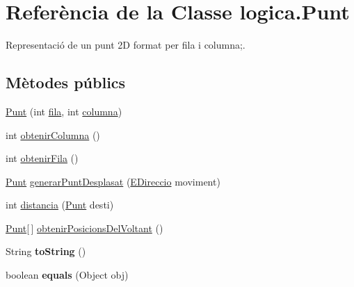\hypertarget{classlogica_1_1_punt}{\section{Referència de la Classe logica.\+Punt}
\label{classlogica_1_1_punt}
}


Representació de un punt 2\+D format per fila i columna;.  


\subsection*{Mètodes públics}
\begin{DoxyCompactItemize}
\item 
\hyperlink{classlogica_1_1_punt_ab09e076ff785e505903c303a6b390844}{Punt} (int \hyperlink{classlogica_1_1_punt_a34834a8a3fba60abcf1f24875adada16}{fila}, int \hyperlink{classlogica_1_1_punt_a3ad06f8482defd7f0306107e747f714e}{columna})
\item 
int \hyperlink{classlogica_1_1_punt_a111fa13504fb44338c3ebae2e4eb104b}{obtenir\+Columna} ()
\item 
int \hyperlink{classlogica_1_1_punt_ac12261ec7534827c8cb7b4cba5bdd5db}{obtenir\+Fila} ()
\item 
\hyperlink{classlogica_1_1_punt}{Punt} \hyperlink{classlogica_1_1_punt_a8198234b3d10d9f83e634b0390c84dcb}{generar\+Punt\+Desplasat} (\hyperlink{enumlogica_1_1enumeracions_1_1_e_direccio}{E\+Direccio} moviment)
\item 
int \hyperlink{classlogica_1_1_punt_a20bb4168bbedb81b73947bfeaf31512a}{distancia} (\hyperlink{classlogica_1_1_punt}{Punt} desti)
\item 
\hyperlink{classlogica_1_1_punt}{Punt}\mbox{[}$\,$\mbox{]} \hyperlink{classlogica_1_1_punt_aae8b444d685a4fab660a51838fc42406}{obtenir\+Posicions\+Del\+Voltant} ()
\item 
\hypertarget{classlogica_1_1_punt_a7ecb9a24b9520b5036471fae8ef3aad5}{String {\bfseries to\+String} ()}\label{classlogica_1_1_punt_a7ecb9a24b9520b5036471fae8ef3aad5}

\item 
\hypertarget{classlogica_1_1_punt_a2734ff6782d3a601961365f018ba4402}{boolean {\bfseries equals} (Object obj)}\label{classlogica_1_1_punt_a2734ff6782d3a601961365f018ba4402}

\end{DoxyCompactItemize}
